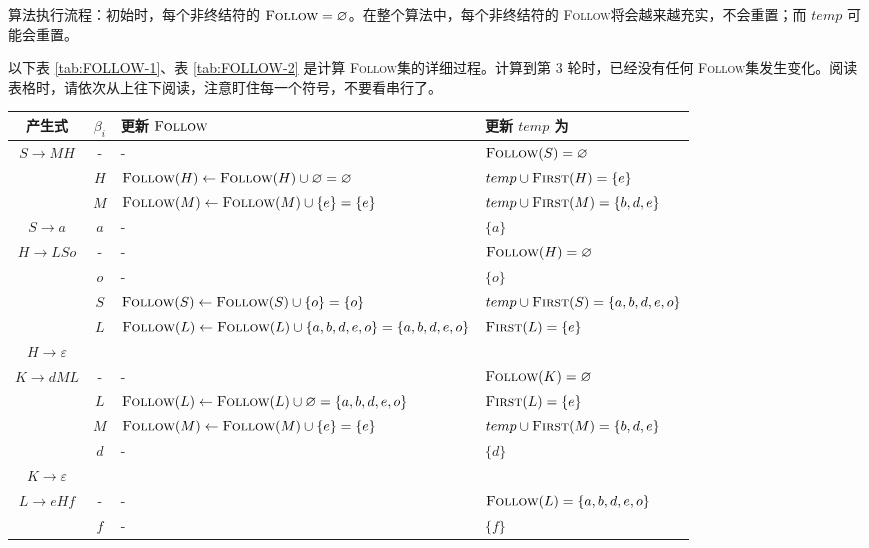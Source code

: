\documentclass[UTF8]{ctexart}
\newcommand\FIRST{\textsc{First}}
\newcommand\FOLLOW{\textsc{Follow}}
\begin{document}
算法执行流程：初始时，每个非终结符的 $\FOLLOW = \varnothing$。在整个算法中，每个非终结符的 \FOLLOW 将会越来越充实，不会重置；而 $temp$ 可能会重置。

以下表 \ref{tab:FOLLOW-1}、表 \ref{tab:FOLLOW-2} 是计算 \FOLLOW 集的详细过程。计算到第 3 轮时，已经没有任何 \FOLLOW 集发生变化。阅读表格时，请依次从上往下阅读，注意盯住每一个符号，不要看串行了。


\begin{landscape}
\begin{table}[p]
    \centering
    \small
    \begin{tabular}{|c|c|l|l|}
    \hline
        产生式 & $\beta_i$ & 更新 $\FOLLOW$ & 更新 $temp$ 为\\
    \hline
        $S\to MH$ & - & - & $\FOLLOW(S) = \varnothing$ \\
                  & $H$ & $\FOLLOW(H)\gets \FOLLOW(H)\cup\varnothing = \varnothing$ & $temp\cup \FIRST(H) = \{e\}$\\
                  & $M$ & $\FOLLOW(M)\gets \FOLLOW(M)\cup\{e\} = \{e\}$ & $temp\cup\FIRST(M) = \{b,d,e\}$ \\
    \hline
        $S\to a$ & $a$ & - & $\{a\}$ \\
    \hline
        $H\to LSo$ & - & - & $\FOLLOW(H) = \varnothing$ \\
                   & $o$ & - & $\{o\}$ \\
                   & $S$ & $\FOLLOW(S)\gets \FOLLOW(S)\cup \{o\} = \{o\}$ & $temp\cup\FIRST(S) = \{a,b,d,e,o\}$ \\
                   & $L$ & $\FOLLOW(L)\gets \FOLLOW(L)\cup \{a,b,d,e,o\} = \{a,b,d,e,o\}$ & $\FIRST(L) = \{e\}$ \\
    \hline
        $H\to \varepsilon$ &&&\\
    \hline
        $K\to dML$ & - & - & $\FOLLOW(K) = \varnothing$ \\
                   & $L$ & $\FOLLOW(L)\gets \FOLLOW(L)\cup\varnothing = \{a,b,d,e,o\}$  & $\FIRST(L) = \{e\}$ \\
                   & $M$ & $\FOLLOW(M)\gets \FOLLOW(M)\cup \{e\} = \{e\}$ & $temp\cup\FIRST(M) = \{b,d,e\}$ \\
                   & $d$ & - & $\{d\}$ \\
    \hline
        $K\to \varepsilon$ &&&\\
    \hline
        $L\to eHf$ & - & - & $\FOLLOW(L) = \{a,b,d,e,o\}$ \\
                   & $f$ & - & $\{f\}$ \\

\end{tabular}
\end{table}
\end{landscape}
\end{document}
